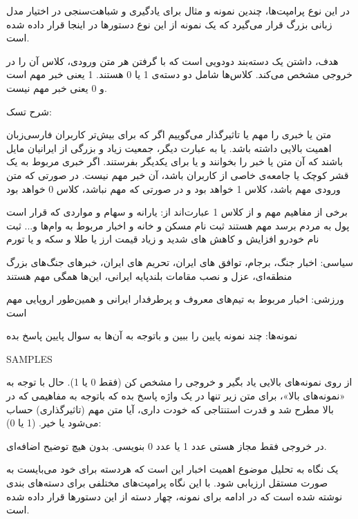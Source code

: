 در این نوع پرامپت‌ها، چندین نمونه و مثال برای یادگیری و شباهت‌سنجی در اختیار مدل زبانی بزرگ قرار می‌گیرد که یک نمونه از این نوع دستورها در اینجا قرار داده شده است.

\vspace{5pt}
\begin{scriptsize}
\begin{itshape}
    هدف، داشتن یک دسته‌بند دودویی است که با گرفتن هر متن ورودی، کلاس آن را در خروجی مشخص می‌کند. کلاس‌ها شامل دو دسته‌ی 1 یا 0 هستند. 1 یعنی خبر مهم است و 0 یعنی خبر مهم نیست.

شرح تسک:

متن یا خبری را مهم یا تاثیرگذار می‌گوییم اگر که برای بیش‌تر کاربران فارسی‌زبان اهمیت بالایی داشته باشد. یا به عبارت دیگر، جمعیت زیاد و بزرگی از ایرانیان مایل باشند که آن متن یا خبر را بخوانند و یا برای یکدیگر بفرستند. اگر خبری مربوط به یک قشر کوچک یا جامعه‌ی خاصی از کاربران باشد، آن خبر مهم نیست.
در صورتی که متن ورودی مهم باشد، کلاس 1 خواهد بود و در صورتی که مهم نباشد، کلاس 0 خواهد بود

برخی از مفاهیم مهم و از کلاس 1 عبارت‌اند از:
یارانه و سهام و مواردی که قرار است پول به مردم برسد مهم هستند
ثبت نام مسکن و خانه و اخبار مربوط به وام‌ها و... 
ثبت نام خودرو
افزایش و کاهش های شدید و زیاد قیمت ارز یا طلا و سکه و یا تورم 

سیاسی:
اخبار جنگ، برجام، توافق های ایران، 
تحریم های ایران، 
خبرهای جنگ‌های بزرگ منطقه‌ای،
عزل و نصب مقامات بلندپایه ایرانی،
این‌ها همگی مهم هستند

ورزشی:
اخبار مربوط به تیم‌های معروف و پرطرفدار ایرانی و همین‌طور اروپایی مهم است


نمونه‌ها: چند نمونه پایین را ببین و باتوجه به آن‌ها به سوال پایین پاسخ بده

SAMPLES

از روی نمونه‌های بالایی یاد بگیر و خروجی را مشخص کن (فقط 0 یا 1).
حال  با توجه به «نمونه‌های بالا»، برای متن زیر تنها در یک واژه پاسخ بده که باتوجه به مفاهیمی که در بالا مطرح شد و قدرت استنتاجی که خودت داری، آیا متن 
مهم (تاثیرگذاری) حساب می‌شود یا خیر. (1 یا 0):

در خروجی فقط مجاز هستی عدد 1 یا عدد 0 بنویسی. بدون هیچ توضیح اضافه‌ای.
\end{itshape}
\end{scriptsize}
\vspace{5pt}

یک نگاه به تحلیل موضوع اهمیت اخبار این است که هردسته برای خود می‌بایست به صورت مستقل ارزیابی شود. با این نگاه پرامپت‌های مختلفی برای دسته‌های بندی نوشته شده است که در ادامه برای نمونه، چهار دسته از این دستور‌ها قرار داده شده است.

